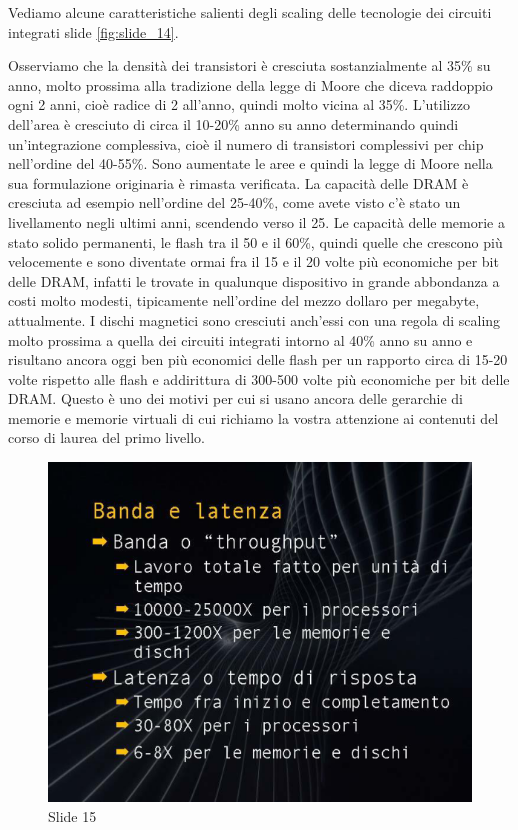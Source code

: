 Vediamo alcune caratteristiche salienti degli scaling delle tecnologie dei circuiti integrati slide \ref{fig:slide_14}.

Osserviamo che la densità dei transistori è cresciuta sostanzialmente al 35\% su anno, molto prossima alla tradizione della legge di Moore che diceva raddoppio ogni 2 anni, cioè radice di 2 all'anno, quindi molto vicina al 35\%.
L'utilizzo dell'area è cresciuto di circa il 10-20\% anno su anno determinando quindi un'integrazione complessiva, cioè il numero di transistori complessivi per chip nell'ordine del 40-55\%.
Sono aumentate le aree e quindi la legge di Moore nella sua formulazione originaria è rimasta verificata.
La capacità delle DRAM è cresciuta ad esempio nell'ordine del 25-40\%, come avete visto c'è stato un livellamento negli ultimi anni, scendendo verso il 25.
Le capacità delle memorie a stato solido permanenti, le flash tra il 50 e il 60\%, quindi quelle che crescono più velocemente e sono diventate ormai fra il 15 e il 20 volte più economiche per bit delle DRAM, infatti le trovate in qualunque dispositivo in grande abbondanza a costi molto modesti, tipicamente nell'ordine del mezzo dollaro per megabyte, attualmente.
I dischi magnetici sono cresciuti anch'essi con una regola di scaling molto prossima a quella dei circuiti integrati intorno al 40\% anno su anno e risultano ancora oggi ben più economici delle flash per un rapporto circa di 15-20 volte rispetto alle flash e addirittura di 300-500 volte più economiche per bit delle DRAM.
Questo è uno dei motivi per cui si usano ancora delle gerarchie di memorie e memorie virtuali di cui richiamo la vostra attenzione ai contenuti del corso di laurea del primo livello.


\begin{figure}[ht]
    \centering
    \includegraphics[width=0.6\linewidth]{images/Lez01_p03_fig_03.png}
    \caption{Slide 15}
    \label{fig:slide_15}
\end{figure}


